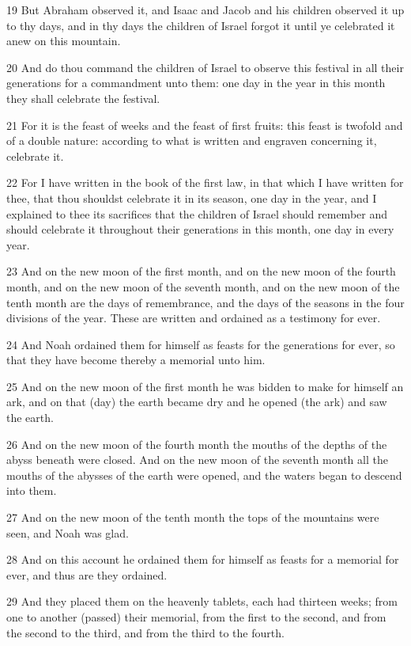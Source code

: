 \par 19 But Abraham observed it, and Isaac and Jacob and his children observed it up to thy days, and in thy days the children of Israel forgot it until ye celebrated it anew on this mountain.
\par 20 And do thou command the children of Israel to observe this festival in all their generations for a commandment unto them: one day in the year in this month they shall celebrate the festival.
\par 21 For it is the feast of weeks and the feast of first fruits: this feast is twofold and of a double nature: according to what is written and engraven concerning it, celebrate it.
\par 22 For I have written in the book of the first law, in that which I have written for thee, that thou shouldst celebrate it in its season, one day in the year, and I explained to thee its sacrifices that the children of Israel should remember and should celebrate it throughout their generations in this month, one day in every year.
\par 23 And on the new moon of the first month, and on the new moon of the fourth month, and on the new moon of the seventh month, and on the new moon of the tenth month are the days of remembrance, and the days of the seasons in the four divisions of the year. These are written and ordained as a testimony for ever.
\par 24 And Noah ordained them for himself as feasts for the generations for ever, so that they have become thereby a memorial unto him.
\par 25 And on the new moon of the first month he was bidden to make for himself an ark, and on that (day) the earth became dry and he opened (the ark) and saw the earth.
\par 26 And on the new moon of the fourth month the mouths of the depths of the abyss beneath were closed. And on the new moon of the seventh month all the mouths of the abysses of the earth were opened, and the waters began to descend into them.
\par 27 And on the new moon of the tenth month the tops of the mountains were seen, and Noah was glad.
\par 28 And on this account he ordained them for himself as feasts for a memorial for ever, and thus are they ordained.
\par 29 And they placed them on the heavenly tablets, each had thirteen weeks; from one to another (passed) their memorial, from the first to the second, and from the second to the third, and from the third to the fourth.
